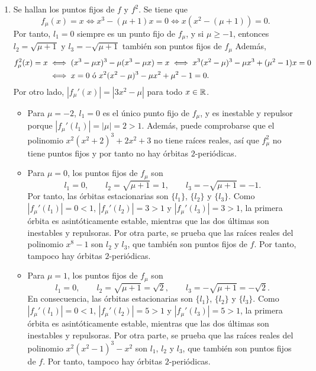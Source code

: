 \documentclass[11pt]{report}
\begin{document}
\begin{solution}
    \hfill
    \begin{enumerate}
        \item Se hallan los puntos fijos de $f$ y $f^2$. Se tiene que
        \[f_\mu(x) = x \iff x^3-(\mu+1)x = 0 \iff x(x^2-(\mu+1)) = 0.\]
        Por tanto, $l_1 = 0$ siempre es un punto fijo de $f_\mu$, y si $\mu \geq -1$, entonces $l_2 = \sqrt{\mu+1}$ y $l_3 = -\sqrt{\mu+1}$ también son puntos fijos de $f_\mu$ Además, 
        \begin{align*}
            f_\mu^2(x) = x &\iff (x^3-\mu x)^3-\mu(x^3-\mu x) = x \iff x^3(x^2-\mu)^3 -\mu x^3 + (\mu^2-1)x = 0 \\
            &\iff x = 0 \textup{ ó } x^2(x^2-\mu)^3 - \mu x^2 + \mu^2 - 1 = 0.
        \end{align*}
        Por otro lado, $|f_\mu'(x)| = |3x^2-\mu|$ para todo $x \in \mathbb R$.
        \begin{itemize}
            \item Para $\mu = -2$, $l_1 = 0$ es el único punto fijo de $f_\mu$, y es inestable y repulsor porque $|f_\mu'(l_1)| = |\mu| = 2 > 1$. Además, puede comprobarse que el polinomio $x^2(x^2+2)^3+2x^2+3$ no tiene raíces reales, así que $f_\mu^2$ no tiene puntos fijos y por tanto no hay órbitas $2$-periódicas.
            \item Para $\mu = 0$, los puntos fijos de $f_\mu$ son
            \[l_1 = 0, \qquad l_2 = \sqrt{\mu+1} = 1, \qquad l_3 = -\sqrt{\mu+1} = -1.\]
            Por tanto, las órbitas estacionarias son $\{l_1\}$, $\{l_2\}$ y $\{l_3\}$. Como $|f_\mu'(l_1)| = 0 < 1$, $|f_\mu'(l_2)| = 3 > 1$ y $|f_\mu'(l_3)| = 3 > 1$, la primera órbita es asintóticamente estable, mientras que las dos últimas son inestables y repulsoras. Por otra parte, se prueba que las raíces reales del polinomio $x^8-1$ son $l_2$ y $l_3$, que también son puntos fijos de $f$. Por tanto, tampoco hay órbitas $2$-periódicas.
            \item Para $\mu = 1$, los puntos fijos de $f_\mu$ son
            \[l_1 = 0, \qquad l_2 = \sqrt{\mu+1} = \sqrt{2}, \qquad l_3 = -\sqrt{\mu+1} = -\sqrt{2}.\]
            En consecuencia, las órbitas estacionarias son $\{l_1\}$, $\{l_2\}$ y $\{l_3\}$. Como $|f_\mu'(l_1)| = 0 < 1$, $|f_\mu'(l_2)| = 5 > 1$ y $|f_\mu'(l_3)| = 5 > 1$, la primera órbita es asintóticamente estable, mientras que las dos últimas son inestables y repulsoras. Por otra parte, se prueba que las raíces reales del polinomio $x^2(x^2-1)^3-x^2$ son $l_1$, $l_2$ y $l_3$, que también son puntos fijos de $f$. Por tanto, tampoco hay órbitas $2$-periódicas.

\end{itemize}
\end{enumerate}
\end{solution}
\end{document}
